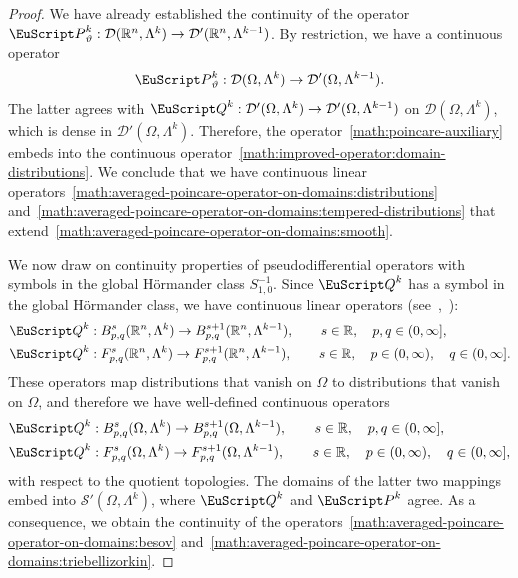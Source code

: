 \documentclass[10pt,a4paper]{amsart}
\theoremstyle{definition}
\theoremstyle{remark}
\numberwithin{equation}{section}
\newcommand{\bbR}{{\mathbb R}}
\newcommand{\calD}{{\mathcal D}}
\newcommand{\calS}{{\mathcal S}}
\newcommand{\euP}{{\EuScript P}}
\newcommand{\euQ}{{\EuScript Q}}
\newcommand{\Domain}{{\Omega}}
\newcommand{\Alt}[1]{\Lambda^{#1}}
\newcommand{\Poincare}{\euP}
\newcommand{\weight}{\vartheta}
\begin{document}
\begin{proof}
We have already established the continuity of the operator $\Poincare^{k}_{\weight} : \calD(\bbR^{n},\Alt{k}) \to \calD'(\bbR^{n},\Alt{k-1})$. 
    By restriction, we have a continuous operator 
    \begin{align}\label{math:poincare-auxiliary}
        \Poincare^{k}_{\weight} : \calD(\Domain,\Alt{k}) \to \calD'(\Domain,\Alt{k-1})
        .
    \end{align}
    The latter agrees with ${\euQ}^{k} : \calD'(\Domain,\Alt{k}) \to \calD'(\Domain,\Alt{k-1})$ on $\calD(\Domain,\Alt{k})$, which is dense in $\calD'(\Domain,\Alt{k})$. Therefore, 
    the operator~\eqref{math:poincare-auxiliary} embeds into the continuous operator~\eqref{math:improved-operator:domain-distributions}.
    We conclude that we have continuous linear operators~\eqref{math:averaged-poincare-operator-on-domains:distributions} and~\eqref{math:averaged-poincare-operator-on-domains:tempered-distributions} that extend~\eqref{math:averaged-poincare-operator-on-domains:smooth}.
    
    


    We now draw on continuity properties of pseudodifferential operators with symbols in the global Hörmander class $S^{-1}_{1,0}$.
    Since ${\euQ^{k}}$ has a symbol in the global Hörmander class, we have continuous linear operators (see~\cite[Theorem~4.1]{kalton2007interpolation},~\cite[Theorem~7, Theorem~9]{marschall1996nonregular}):
    \begin{align*}
        \euQ^{k} &: B^{s}_{p,q}(\bbR^{n},\Alt{k}) \to B^{s+1}_{p,q}(\bbR^{n},\Alt{k-1}), \qquad s \in \bbR, \quad p, q \in (0,\infty]
        ,
        \\
        \euQ^{k} &: F^{s}_{p,q}(\bbR^{n},\Alt{k}) \to F^{s+1}_{p,q}(\bbR^{n},\Alt{k-1}), \qquad s \in \bbR, \quad p \in (0,\infty), \quad q \in (0,\infty]
        .
    \end{align*}
    These operators map distributions that vanish on $\Domain$ to distributions that vanish on $\Domain$,
    and therefore we have well-defined continuous operators
    \begin{align*}
        \euQ^{k} &: B^{s}_{p,q}(\Domain,\Alt{k}) \to B^{s+1}_{p,q}(\Domain,\Alt{k-1}), \qquad s \in \bbR, \quad p, q \in (0,\infty]
        ,
        \\
        \euQ^{k} &: F^{s}_{p,q}(\Domain,\Alt{k}) \to F^{s+1}_{p,q}(\Domain,\Alt{k-1}), \qquad s \in \bbR, \quad p \in (0,\infty), \quad q \in (0,\infty]
        ,
    \end{align*}
    with respect to the quotient topologies. 
    The domains of the latter two mappings embed into $\calS'(\Domain,\Alt{k})$, where $\euQ^{k}$ and $\Poincare^{k}$ agree. 
    As a consequence, we obtain the continuity of the operators~\eqref{math:averaged-poincare-operator-on-domains:besov} and~\eqref{math:averaged-poincare-operator-on-domains:triebellizorkin}.



\end{proof}
\end{document}
